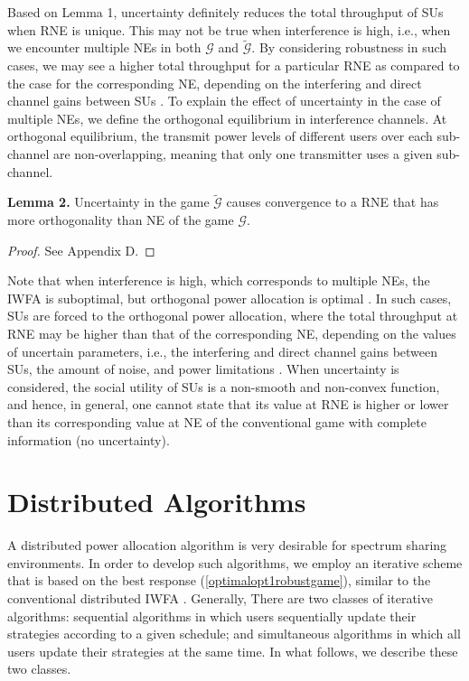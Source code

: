 \documentclass[peerreview,onecolumn,11pt,draftclsnofoot]{IEEEtran}\usepackage{amsmath}\usepackage{amsfonts}\usepackage{epsfig}\usepackage{amssymb}\usepackage{graphicx}\usepackage{amssymb,amsmath}\usepackage{cite}\usepackage{color,soul}\newcommand\T{\rule{0pt}{3.1ex}}
\begin{document}
Based on Lemma 1, uncertainty definitely reduces the total
throughput of SUs when RNE is unique. This may not be
true when interference is high, i.e., when we encounter multiple NEs in both $\mathcal{G}$ and $\widetilde{\mathcal{G}}$. By considering robustness in such cases, we may see a higher total throughput for a particular RNE as compared to the case for the corresponding NE, depending on the interfering and direct channel gains between SUs \cite{ProbabilisticIWFA,Robustnew}.
To explain the effect of uncertainty in the case of multiple NEs, we define the orthogonal equilibrium in interference channels. At orthogonal equilibrium, the transmit power levels of different users over each sub-channel are non-overlapping, meaning that only one transmitter uses a given sub-channel.

\textbf{Lemma 2.} Uncertainty in the game $\widetilde{\mathcal{G}}$ causes convergence to a RNE that has more orthogonality than NE of the game $\mathcal{G}$.

\begin{proof}
See Appendix D.
\end{proof}

Note that when interference is high, which corresponds to multiple NEs, the IWFA is suboptimal, but orthogonal power allocation is optimal \cite{SimultanousWFA,Spectrumsharing}. In such cases, SUs are forced to the orthogonal power allocation, where the total throughput at RNE may be higher than that of the corresponding NE, depending on the values of uncertain parameters, i.e., the interfering and direct channel gains between SUs, the amount of noise, and power limitations \cite{ProbabilisticIWFA,Robustnew}. When uncertainty is considered, the social utility of SUs is a non-smooth and non-convex function, and hence, in general, one cannot state that its value at RNE is higher or lower than its corresponding value at NE of the conventional game with complete information (no uncertainty).


\section{Distributed Algorithms}
A distributed power allocation algorithm is very desirable for
spectrum sharing environments. In order to develop such algorithms, we employ an iterative scheme that is based on the best response (\ref{optimalopt1robustgame}), similar to  the conventional distributed IWFA \cite{Nash2}. Generally, There are two classes of iterative algorithms: sequential algorithms in which users sequentially update their strategies according to a given schedule; and simultaneous algorithms in which all users update their strategies at the same time. In what follows, we describe these two classes.
\end{document}
